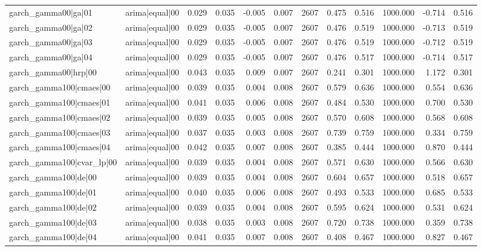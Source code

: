 \begin{table}
\begin{tabular}{llrrrrrrrrrr}
garch\_gamma00|ga|01 & arima|equal|00 & 0.029 & 0.035 & -0.005 & 0.007 & 2607 & 0.475 & 0.516 & 1000.000 & -0.714 & 0.516 \\
garch\_gamma00|ga|02 & arima|equal|00 & 0.029 & 0.035 & -0.005 & 0.007 & 2607 & 0.476 & 0.519 & 1000.000 & -0.713 & 0.519 \\
garch\_gamma00|ga|03 & arima|equal|00 & 0.029 & 0.035 & -0.005 & 0.007 & 2607 & 0.476 & 0.519 & 1000.000 & -0.712 & 0.519 \\
garch\_gamma00|ga|04 & arima|equal|00 & 0.029 & 0.035 & -0.005 & 0.007 & 2607 & 0.476 & 0.517 & 1000.000 & -0.714 & 0.517 \\
garch\_gamma00|hrp|00 & arima|equal|00 & 0.043 & 0.035 & 0.009 & 0.007 & 2607 & 0.241 & 0.301 & 1000.000 & 1.172 & 0.301 \\
garch\_gamma100|cmaes|00 & arima|equal|00 & 0.039 & 0.035 & 0.004 & 0.008 & 2607 & 0.579 & 0.636 & 1000.000 & 0.554 & 0.636 \\
garch\_gamma100|cmaes|01 & arima|equal|00 & 0.041 & 0.035 & 0.006 & 0.008 & 2607 & 0.484 & 0.530 & 1000.000 & 0.700 & 0.530 \\
garch\_gamma100|cmaes|02 & arima|equal|00 & 0.039 & 0.035 & 0.005 & 0.008 & 2607 & 0.570 & 0.608 & 1000.000 & 0.568 & 0.608 \\
garch\_gamma100|cmaes|03 & arima|equal|00 & 0.037 & 0.035 & 0.003 & 0.008 & 2607 & 0.739 & 0.759 & 1000.000 & 0.334 & 0.759 \\
garch\_gamma100|cmaes|04 & arima|equal|00 & 0.042 & 0.035 & 0.007 & 0.008 & 2607 & 0.385 & 0.444 & 1000.000 & 0.870 & 0.444 \\
garch\_gamma100|cvar\_lp|00 & arima|equal|00 & 0.039 & 0.035 & 0.004 & 0.008 & 2607 & 0.571 & 0.630 & 1000.000 & 0.566 & 0.630 \\
garch\_gamma100|de|00 & arima|equal|00 & 0.039 & 0.035 & 0.004 & 0.008 & 2607 & 0.604 & 0.657 & 1000.000 & 0.518 & 0.657 \\
garch\_gamma100|de|01 & arima|equal|00 & 0.040 & 0.035 & 0.006 & 0.008 & 2607 & 0.493 & 0.533 & 1000.000 & 0.685 & 0.533 \\
garch\_gamma100|de|02 & arima|equal|00 & 0.039 & 0.035 & 0.004 & 0.008 & 2607 & 0.595 & 0.624 & 1000.000 & 0.531 & 0.624 \\
garch\_gamma100|de|03 & arima|equal|00 & 0.038 & 0.035 & 0.003 & 0.008 & 2607 & 0.720 & 0.738 & 1000.000 & 0.359 & 0.738 \\
garch\_gamma100|de|04 & arima|equal|00 & 0.041 & 0.035 & 0.007 & 0.008 & 2607 & 0.408 & 0.467 & 1000.000 & 0.827 & 0.467 \\

\end{tabular}
\end{table}
